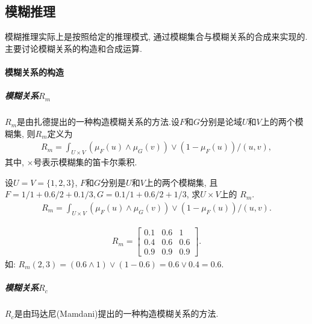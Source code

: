 \subsection{模糊推理}
模糊推理实际上是按照给定的推理模式, 通过模糊集合与模糊关系的合成来实现的. 主要讨论模糊关系的构造和合成运算.

\paragraph{模糊关系的构造}
\subparagraph{\textbf{模糊关系$R_m$}}

$R_m$是由扎德提出的一种构造模糊关系的方法.设$F$和$G$分别是论域$U$和$V$上的两个模糊集, 则$R_m$定义为
\begin{align}
  R_{m}=\int_{U \times V}\left(\mu_{F}(u) \wedge \mu_{G}(v)\right) \vee\left(1-\mu_{F}(u)\right) /(u, v),
\end{align}
其中, $\times$号表示模糊集的笛卡尔乘积.
\begin{example}\label{AIFuzzyexamp654}
 设$U=V=\{1,2,3\}$, $F$和$G$分别是$U$和$V$上的两个模糊集, 且$F=1/1+0.6/2+0.1/3,G=0.1/1+0.6/2+1/3$, 求$U\times V$上的 $R_m$.
\begin{align*}
    R_{m}=\int_{U \times V}\left(\mu_{F}(u) \wedge \mu_{G}(v)\right) \vee\left(1-\mu_{F}(u)\right) /(u, v).
\end{align*}
\vspace{-0.3cm}
\end{example}
\begin{result}
\begin{align*}
    R_{m}=\left[
    \begin{array}{ccc}
    {0.1} & {0.6} & {1} \\ 
    {0.4} & {0.6} & {0.6} \\ 
    {0.9} & {0.9} & {0.9}
    \end{array}\right].
\end{align*}
如: $R_m(2, 3) =(0.6\wedge 1)\vee (1-0.6)=0.6\vee 0.4=0.6$.
\end{result}
\subparagraph{模糊关系$R_c$}
$R_c$是由玛达尼(Mamdani)提出的一种构造模糊关系的方法.

